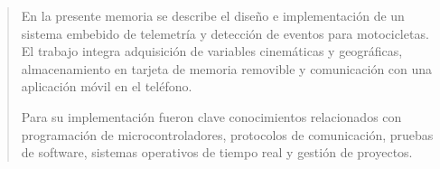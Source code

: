 \documentclass[
    11pt,
    spanish,
    singlespacing,
    parskip,
    headsepline,
    bookmarks=true,
    unicode=true,
    pdftoolbar=true,
    pdfmenubar=true,
    pdffitwindow=false,
    colorlinks=true,
    linkcolor=blue,
    citecolor=blue,
    urlcolor=blue
]{MastersDoctoralThesis}
\def\textbf#1{#1}%
\begin{document}



\frontmatter %
\pagestyle{plain} %


\begin{abstract}
\addchaptertocentry{\abstractname}
En la presente memoria se describe el diseño e implementación de un sistema embebido de telemetría y detección de eventos para motocicletas. El trabajo integra adquisición de variables cinemáticas y geográficas, almacenamiento en tarjeta de memoria removible y comunicación con una aplicación móvil en el teléfono.

Para su implementación fueron clave conocimientos relacionados con programación de microcontroladores, protocolos de comunicación, pruebas de software, sistemas operativos de tiempo real y gestión de proyectos.
\end{abstract}




\tableofcontents
\listoffigures
\listoftables

\end{document}

